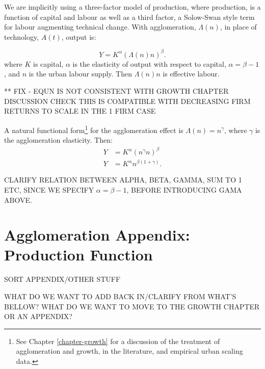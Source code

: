 We are implicitly using a three-factor model of \gls{production}, where production, is a function of capital and labour as well as a third factor, a Solow-Swan style term for labour augmenting technical change.
 With \gls{agglomeration}, $\Lambda(n)$, in place of technology, $A(t)$, output is:

\begin{equation}
Y=K^{\alpha }(\Lambda(n)n)^{\beta }.
\label{Eqn:Prod1}
\end{equation}
where $K$ is capital, $\alpha$ is the elasticity of output with respect to capital, $\alpha = \beta - 1$, and  $n$ is the \gls{urban labour supply}. Then $\Lambda(n)n$ is \gls{effective labour}. 

** FIX - EQUN IS NOT CONSISTENT WITH GROWTH CHAPTER DISCUSSION
CHECK THIS IS COMPATIBLE WITH DECREASING FIRM RETURNS TO SCALE IN THE 1 FIRM CASE 

A natural functional form\footnote{See Chapter \ref{chapter-growth} for a discussion of the treatment of agglomeration and growth, in the literature, and empirical urban scaling data.} for the agglomeration effect %
is $\Lambda(n) = n^\gamma$, where $\gamma$ is the agglomeration \gls{elasticity}. Then:
\begin{eqnarray}
 Y&=K^{\alpha }(n^{\gamma}n)^{\beta}  \nonumber\\
 Y&=K^{\alpha }n^{\beta(1 + \gamma)}.
 \label{Eqn:Prod2}
\end{eqnarray}

CLARIFY RELATION BETWEEN ALPHA,  BETA, GAMMA, SUM TO 1 ETC, SINCE WE SPECIFY $\alpha = \beta - 1$, BEFORE INTRODUCING GAMA ABOVE.


\section{Agglomeration Appendix: Production Function}
SORT APPENDIX/OTHER STUFF

WHAT DO WE WANT TO ADD BACK IN/CLARIFY FROM WHAT'S BELLOW? 
WHAT DO WE WANT TO MOVE TO THE GROWTH CHAPTER OR AN APPENDIX?

 
